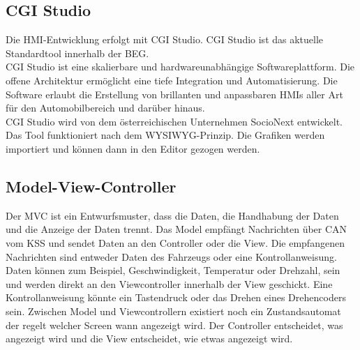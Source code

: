 \subsection{CGI Studio}
Die \ac{HMI}-Entwicklung erfolgt mit CGI Studio. CGI Studio ist das aktuelle Standardtool innerhalb der \ac{BEG}.\\

\glqq CGI Studio ist eine skalierbare und hardwareunabhängige Softwareplattform. Die offene Architektur ermöglicht eine tiefe Integration und Automatisierung. Die Software erlaubt die Erstellung von brillanten und anpassbaren \acp{HMI} aller Art für den Automobilbereich und darüber hinaus.\grqq{} \cite{canderaFAQ}\\

CGI Studio wird von dem österreichischen Unternehmen SocioNext entwickelt. Das Tool funktioniert nach dem \ac{WYSIWYG}-Prinzip. Die Grafiken werden importiert und können dann in den Editor gezogen werden.\\

\subsection{Model-View-Controller}
Der \ac{MVC} ist ein Entwurfsmuster, dass die Daten, die Handhabung der Daten und die Anzeige der Daten trennt. Das Model empfängt Nachrichten über \ac{CAN} vom \ac{KSS} und sendet Daten an den Controller oder die View. Die empfangenen Nachrichten sind entweder Daten des Fahrzeugs oder eine Kontrollanweisung. Daten können zum Beispiel, Geschwindigkeit, Temperatur oder Drehzahl, sein und werden direkt an den Viewcontroller innerhalb der View geschickt. Eine Kontrollanweisung könnte ein Tastendruck oder das Drehen eines Drehencoders sein. Zwischen Model und Viewcontrollern existiert noch ein Zustandsautomat der regelt welcher Screen wann angezeigt wird. Der Controller entscheidet, was angezeigt wird und die View entscheidet, wie etwas angezeigt wird.\\


